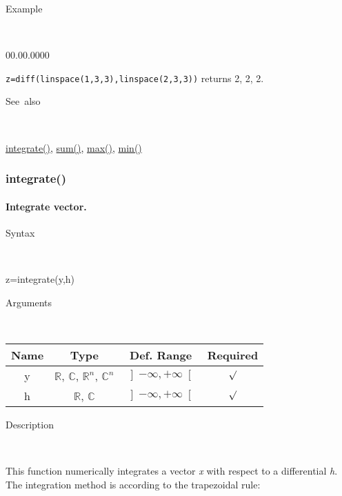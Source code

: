 \begin{description}
\item [Example]~
\end{description}
\begin{lyxlist}{00.00.0000}
\item [\texttt{z=diff(linspace(1,3,3),linspace(2,3,3))}]returns 2, 2, 2.
\end{lyxlist}
\begin{description}
\item [See~also]~
\end{description}
\textcolor{blue}{\hyperlink{integrate}{integrate()}}\textcolor{black}{,}
\textcolor{blue}{\hyperlink{sum}{sum()}}\textcolor{black}{,} \textcolor{blue}{\hyperlink{max}{max()}}\textcolor{black}{,}
\textcolor{blue}{\hyperlink{min}{min()}}


\newpage
\subsubsection*{\hypertarget{integrate}{}{\Large integrate()}}


\paragraph{\label{par:Integrate}Integrate vector.}

\begin{description}
\item [Syntax]~
\end{description}
z=integrate(y,h)

\begin{description}
\item [Arguments]~
\end{description}
\begin{tabular}{|c|c|c|c|}
\hline 
Name&
Type&
Def. Range&
Required\tabularnewline
\hline
\hline 
y&
$\mathbb{R}$, $\mathbb{C}$, $\mathbb{R}^{n}$, $\mathbb{C}^{n}$&
$\left]-\infty,+\infty\right[$&
$\surd$\tabularnewline
\hline 
h&
$\mathbb{R}$, $\mathbb{C}$&
$\left]-\infty,+\infty\right[$&
$\surd$\tabularnewline
\hline
\end{tabular}

\begin{description}
\item [Description]~
\end{description}
This function numerically integrates a vector \textit{x} with respect
to a differential \textit{h}. The integration method is according
to the trapezoidal rule:

